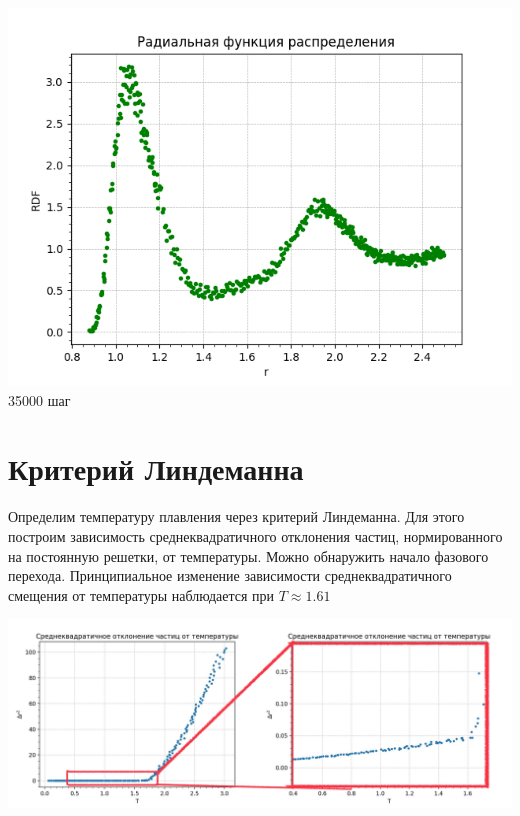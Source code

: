 \begin{minipage}{0.05\textwidth}
\begin{center}

\Longrightarrow

\end{center}
\end{minipage}
\begin{minipage}{0.3\textwidth}
    \begin{center}
        \includegraphics[width=\linewidth]{8.png}\\
        35000 шаг
    \end{center}
\end{minipage}

\section{Критерий Линдеманна}

Определим температуру плавления через критерий Линдеманна. Для этого построим зависимость среднеквадратичного отклонения частиц, нормированного на постоянную решетки, от температуры. Можно обнаружить начало фазового перехода. Принципиальное изменение зависимости среднеквадратичного смещения от температуры наблюдается при $T \approx 1.61$

\begin{center}
        \includegraphics[width=\linewidth]{9.png}\\
        \end{center}


